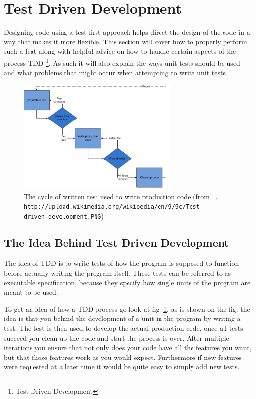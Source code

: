 
\section{Test Driven Development}

Designing code using a test first approach helps direct the design
of the code in a way that makes it more flexible. This section will
cover how to properly perform such a feat along with helpful advice
on how to handle certain aspects of the process TDD%
\footnote{Test Driven Development%
}. As such it will also explain the ways unit tests should be used
and what problems that might occur when attempting to write unit tests. 

\begin{figure}
\begin{centering}
\includegraphics[width=0.7\textwidth]{TestWrittenCycle}
\par\end{centering}

\caption{The cycle of written test used to write production code (from ~\cite{WikiTDD},
\texttt{http://upload.wikimedia.org/wikipedia/en/9/9c/Test-driven\_development.PNG})\label{fig:TestWrittenCycle}}
\end{figure}



\subsection*{The Idea Behind Test Driven Development}

The idea of TDD is to write tests of how the program is supposed to
function before actually writing the program itself. These tests can
be referred to as executable specification, because they specify how
single units of the program are meant to be used.

To get an idea of how a TDD process go look at fig. \ref{fig:TestWrittenCycle},
as is shown on the fig. the idea is that you behind the development
of a unit in the program by writing a test. The test is then used
to develop the actual production code, once all tests succeed you
clean up the code and start the process is over. After multiple iterations
you ensure that not only does your code have all the features you
want, but that those features work as you would expect. Furthermore
if new features were requested at a later time it would be quite easy
to simply add new tests. 

